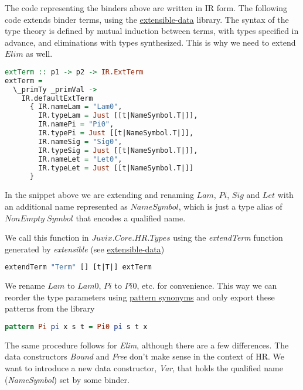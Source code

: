 \documentclass[acmsmall]{acmart}
\numberwithin{figure}{subsection}
\begin{document}
The code representing the binders above are written in IR form.
The following code extends binder terms, using the \href{https://heliaxdev.github.io/extensible-data/Extensible.html}{extensible-data} library. The syntax of the type theory is defined by mutual induction between terms, with types specified in advance, and eliminations with types synthesized. This is why we need to extend $Elim$ as well.

\begin{lstlisting}[language=haskell]
extTerm :: p1 -> p2 -> IR.ExtTerm
extTerm =
  \_primTy _primVal ->
    IR.defaultExtTerm
      { IR.nameLam = "Lam0",
        IR.typeLam = Just [[t|NameSymbol.T|]],
        IR.namePi = "Pi0",
        IR.typePi = Just [[t|NameSymbol.T|]],
        IR.nameSig = "Sig0",
        IR.typeSig = Just [[t|NameSymbol.T|]],
        IR.nameLet = "Let0",
        IR.typeLet = Just [[t|NameSymbol.T|]]
      }
\end{lstlisting}

In the snippet above we are extending and renaming $Lam$, $Pi$, $Sig$ and $Let$ with an additional name represented as $NameSymbol$, which is just a type alias of $NonEmpty \; Symbol$ that encodes a qualified name.

We call this function in $Juvix.Core.HR.Types$ using the \textit{extendTerm} function generated by \textit{extensible} (see \href{https://heliaxdev.github.io/extensible-data/Extensible.html}{extensible-data})

\begin{lstlisting}[language=haskell]
extendTerm "Term" [] [t|T|] extTerm
\end{lstlisting}

We rename $Lam$ to $Lam0$, $Pi$ to $Pi0$, etc. for convenience. This way we can reorder the type parameters using \href{https://ghc.gitlab.haskell.org/ghc/doc/users_guide/exts/pattern_synonyms.html}{pattern synonyms} and only export these patterns from the library


\begin{lstlisting}[language=haskell]
pattern Pi pi x s t = Pi0 pi s t x
\end{lstlisting}

The same procedure follows for \textit{Elim}, although there are a few differences. The data constructors \textit{Bound} and \textit{Free} don't make sense in the context of HR. We want to introduce a new data constructor, \textit{Var}, that holds the qualified name (\textit{NameSymbol}) set by some binder.
\end{document}
